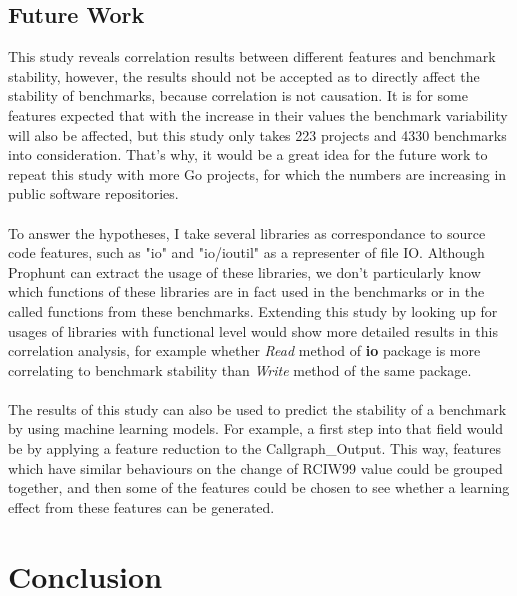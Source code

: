 \documentclass{seal_thesis}
\begin{document}
\section{Future Work}

This study reveals correlation results between different features and benchmark stability, however, the results should not be accepted as to directly affect the stability of benchmarks, because correlation is not causation. It is for some features expected that with the increase in their values the benchmark variability will also be affected, but this study only takes 223 projects and 4330 benchmarks into consideration. That's why, it would be a great idea for the future work to repeat this study with more Go projects, for which the numbers are increasing in public software repositories.\\
\\
To answer the hypotheses, I take several libraries as correspondance to source code features, such as "io" and "io/ioutil" as a representer of file IO. Although Prophunt can extract the usage of these libraries, we don't particularly know which functions of these libraries are in fact used in the benchmarks or in the called functions from these benchmarks. Extending this study by looking up for usages of libraries with functional level would show more detailed results in this correlation analysis, for example whether \textit{Read} method of \textbf{io} package is more correlating to benchmark stability than \textit{Write} method of the same package.\\
\\
The results of this study can also be used to predict the stability of a benchmark by using machine learning models. For example, a first step into that field would be by applying a feature reduction to the Callgraph\_Output. This way, features which have similar behaviours on the change of RCIW99 value could be grouped together, and then some of the features could be chosen to see whether a learning effect from these features can be generated.


\chapter{Conclusion}
\label{Conclusion}
\end{document}
